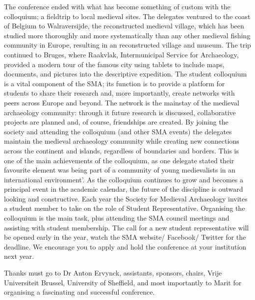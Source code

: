 \documentclass[%
	]{ijsra}
\begin{document}
The conference ended with what has become something of custom with the colloquium; a fieldtrip to local medieval sites. The delegates ventured to the coast of Belgium to Walraversijde, the reconstructed medieval village, which has been studied more thoroughly and more systematically than any other medieval fishing community in Europe, resulting in an reconstructed village and museum. The trip continued to Bruges, where Raakvlak, Intermunicipal Service for Archaeology, provided a modern tour of the famous city using tablets to include maps, documents, and pictures into the descriptive expedition. 
The student colloquium is a vital component of the SMA; its function is to provide a platform for students to share their research and, more importantly, create networks with peers across Europe and beyond. The network is the mainstay of the medieval archaeology community: through it future research is discussed, collaborative projects are planned and, of course, friendships are created. By joining the society and attending the colloquium (and other SMA events) the delegates maintain the medieval archaeology community while creating new connections across the continent and islands, regardless of boundaries and borders. This is one of the main achievements of the colloquium, as one delegate stated their favourite element was being part of a community of young medievalists in an international environment’. As the colloquium continues to grow and becomes a principal event in the academic calendar, the future of the discipline is outward looking and constructive.
Each year the Society for Medieval Archaeology invites a student member to take on the role of Student Representative. Organising the colloquium is the main task, plus attending the SMA council meetings and assisting with student membership. The call for a new student representative will be opened early in the year, watch the SMA website/ Facebook/ Twitter for the deadline. We encourage you to apply and hold the conference at your institution next year.

Thanks must go to Dr Anton Ervynck, assistants, sponsors, chairs, Vrije Universiteit Brussel, University of Sheffield, and most importantly to Marit for organising a fascinating and successful conference.


\iffalse
\IJSRAsection{small headline}

\IJSRAseparator
\fi

\IJSRAclosing%
\end{document}
